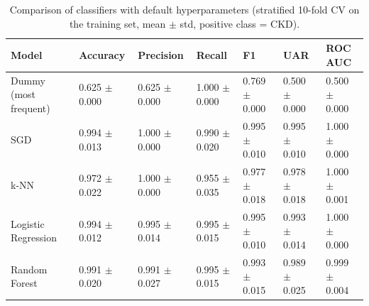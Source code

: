 \begin{table}
\caption{Comparison of classifiers with default hyperparameters (stratified 10-fold CV on the training set, mean $\pm$ std, positive class = CKD).}
\label{tab:model_comparison}
\begin{tabular}{lllllll}
\toprule
Model & Accuracy & Precision & Recall & F1 & UAR & ROC AUC \\
\midrule
Dummy (most frequent) & 0.625 $\pm$ 0.000 & 0.625 $\pm$ 0.000 & 1.000 $\pm$ 0.000 & 0.769 $\pm$ 0.000 & 0.500 $\pm$ 0.000 & 0.500 $\pm$ 0.000 \\
SGD & 0.994 $\pm$ 0.013 & 1.000 $\pm$ 0.000 & 0.990 $\pm$ 0.020 & 0.995 $\pm$ 0.010 & 0.995 $\pm$ 0.010 & 1.000 $\pm$ 0.000 \\
k-NN & 0.972 $\pm$ 0.022 & 1.000 $\pm$ 0.000 & 0.955 $\pm$ 0.035 & 0.977 $\pm$ 0.018 & 0.978 $\pm$ 0.018 & 1.000 $\pm$ 0.001 \\
Logistic Regression & 0.994 $\pm$ 0.012 & 0.995 $\pm$ 0.014 & 0.995 $\pm$ 0.015 & 0.995 $\pm$ 0.010 & 0.993 $\pm$ 0.014 & 1.000 $\pm$ 0.000 \\
Random Forest & 0.991 $\pm$ 0.020 & 0.991 $\pm$ 0.027 & 0.995 $\pm$ 0.015 & 0.993 $\pm$ 0.015 & 0.989 $\pm$ 0.025 & 0.999 $\pm$ 0.004 \\
\bottomrule
\end{tabular}
\end{table}
